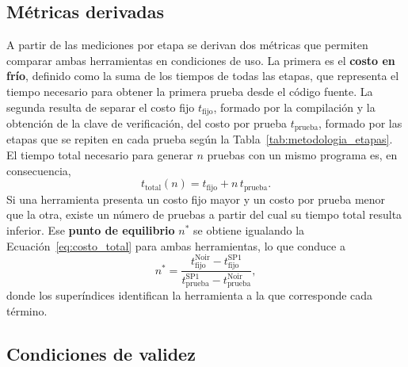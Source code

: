 \subsection{Métricas derivadas}
\label{sec:metodologia_metricas}

A partir de las mediciones por etapa se derivan dos métricas que permiten comparar ambas
herramientas en condiciones de uso. La primera es el \textbf{costo en frío}, definido como la suma
de los tiempos de todas las etapas, que representa el tiempo necesario para obtener la primera
prueba desde el código fuente. La segunda resulta de separar el costo fijo $t_{\mathrm{fijo}}$,
formado por la compilación y la obtención de la clave de verificación, del costo por prueba
$t_{\mathrm{prueba}}$, formado por las etapas que se repiten en cada prueba según la
Tabla~\ref{tab:metodologia_etapas}. El tiempo total necesario para generar $n$ pruebas con un
mismo programa es, en consecuencia,
\begin{equation}
	\label{eq:costo_total}
	t_{\mathrm{total}}(n) = t_{\mathrm{fijo}} + n \, t_{\mathrm{prueba}}.
\end{equation}
Si una herramienta presenta un costo fijo mayor y un costo por prueba menor que la otra, existe un
número de pruebas a partir del cual su tiempo total resulta inferior. Ese \textbf{punto de
equilibrio} $n^{*}$ se obtiene igualando la Ecuación~\eqref{eq:costo_total} para ambas
herramientas, lo que conduce a
\begin{equation}
	\label{eq:punto_equilibrio}
	n^{*} = \frac{t^{\mathrm{Noir}}_{\mathrm{fijo}} - t^{\mathrm{SP1}}_{\mathrm{fijo}}}
	{t^{\mathrm{SP1}}_{\mathrm{prueba}} - t^{\mathrm{Noir}}_{\mathrm{prueba}}},
\end{equation}
donde los superíndices identifican la herramienta a la que corresponde cada término.

\subsection{Condiciones de validez}
\label{sec:metodologia_validez}

